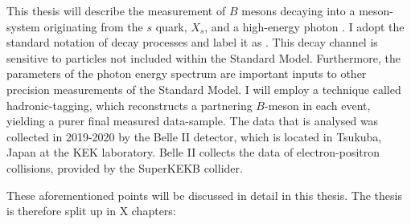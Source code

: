 This thesis will describe the measurement of $B$ mesons decaying into a meson-system originating from the $s$ quark, $X_s$, and a high-energy photon \g.
I adopt the standard notation of decay processes and label it as \BtoXsgamma.
This decay channel is sensitive to particles not included within the Standard Model. 
Furthermore, the parameters of the photon energy spectrum are important inputs to other precision measurements of the Standard Model.
I will employ a technique called hadronic-tagging, which reconstructs a partnering $B$-meson in each event, yielding a purer final measured data-sample.
The data that is analysed was collected in 2019-2020 by the Belle II detector, which is located in Tsukuba, Japan at the KEK laboratory.
Belle II collects the data of electron-positron collisions, provided by the SuperKEKB collider.

These aforementioned points will be discussed in detail in this thesis.
The thesis is therefore split up in X chapters:

